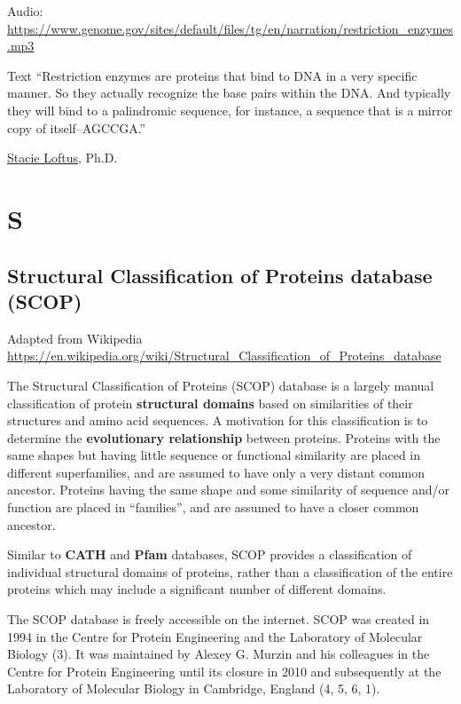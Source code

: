\documentclass[
]{book}
\begin{document}
Audio: \url{https://www.genome.gov/sites/default/files/tg/en/narration/restriction_enzymes.mp3}

Text ``Restriction enzymes are proteins that bind to DNA in a very specific manner. So they actually recognize the base pairs within the DNA. And typically they will bind to a palindromic sequence, for instance, a sequence that is a mirror copy of itself--AGCCGA.''

\href{https://www.genome.gov/staff/Stacie-Loftus-PhD}{Stacie Loftus}, Ph.D.

\hypertarget{s}{%
\chapter{S}\label{s}}

\hypertarget{structural-classification-of-proteins-database-scop}{%
\section{Structural Classification of Proteins database (SCOP)}\label{structural-classification-of-proteins-database-scop}}

Adapted from Wikipedia
\url{https://en.wikipedia.org/wiki/Structural_Classification_of_Proteins_database}

The Structural Classification of Proteins (SCOP) database is a largely manual classification of protein \textbf{structural domains} based on similarities of their structures and amino acid sequences. A motivation for this classification is to determine the \textbf{evolutionary relationship} between proteins. Proteins with the same shapes but having little sequence or functional similarity are placed in different superfamilies, and are assumed to have only a very distant common ancestor. Proteins having the same shape and some similarity of sequence and/or function are placed in ``families'', and are assumed to have a closer common ancestor.

Similar to \textbf{CATH} and \textbf{Pfam} databases, SCOP provides a classification of individual structural domains of proteins, rather than a classification of the entire proteins which may include a significant number of different domains.

The SCOP database is freely accessible on the internet. SCOP was created in 1994 in the Centre for Protein Engineering and the Laboratory of Molecular Biology (3). It was maintained by Alexey G. Murzin and his colleagues in the Centre for Protein Engineering until its closure in 2010 and subsequently at the Laboratory of Molecular Biology in Cambridge, England (4, 5, 6, 1).
\end{document}
